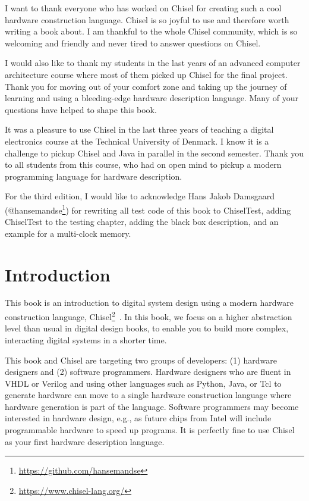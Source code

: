 \documentclass[%
    10pt,
    headinclude, footexclude,
    openright, %
    notitlepage,
    cleardoubleempty,
    headsepline,
    pointlessnumbers,
    bibtotoc, idxtotoc,
    ]{scrbook}
\newcommand{\myref}[2]{\href{#1}{#2}}
\renewcommand{\myref}[2]{{#2}{\footnote{\url{#1}}}}
\begin{document}
I want to thank everyone who has worked on Chisel for creating such
a cool hardware construction language. Chisel is so joyful to use and
therefore worth writing a book about.
I am thankful to the whole Chisel community, which is so welcoming and friendly
and never tired to answer questions on Chisel.

I would also like to thank my students in the last years of an advanced computer
architecture course where most of them picked up Chisel for the final project.
Thank you for moving out of your comfort zone and taking up the journey of
learning and using a bleeding-edge hardware description language.
Many of your questions have helped to shape this book.

It was a pleasure to use Chisel in the last three years of teaching a digital electronics
course at the Technical University of Denmark.
I know it is a challenge to pickup Chisel and Java in parallel in the second
semester. Thank you to all students from this course, who had on open mind to
pickup a modern programming language for hardware description.

For the third edition, I would like to acknowledge Hans Jakob Damsgaard
(\myref{https://github.com/hansemandse}{@hansemandse}) for rewriting
all test code of this book to ChiselTest, adding ChiselTest to the testing chapter, adding the black
box description, and an example for a multi-clock memory.


\mainmatter

\chapter{Introduction}
\label{sec:intro}

This book is an introduction to digital system design using a modern hardware
construction language, \myref{https://www.chisel-lang.org/}{Chisel}~\cite{chisel:dac2012}.
In this book, we focus on a higher abstraction level than usual in digital design books,
to enable you to build more complex, interacting digital systems in a shorter time.

This book and Chisel are targeting two groups of developers:
(1) hardware designers and (2) software programmers.
Hardware designers who are fluent in VHDL or Verilog and using other languages such as Python,
Java, or Tcl to generate hardware can move to a single hardware construction language
where hardware generation is part of the language.
Software programmers may become interested in hardware design,
e.g., as future chips from Intel will include programmable hardware to speed up programs.
It is perfectly fine to use Chisel as your first hardware description language.
\end{document}
